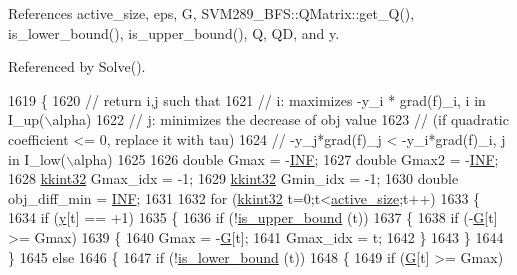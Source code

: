 References active\+\_\+size, eps, G, S\+V\+M289\+\_\+\+B\+F\+S\+::\+Q\+Matrix\+::get\+\_\+\+Q(), is\+\_\+lower\+\_\+bound(), is\+\_\+upper\+\_\+bound(), Q, QD, and y.



Referenced by Solve().


\begin{DoxyCode}
1619 \{
1620   \textcolor{comment}{// return i,j such that}
1621   \textcolor{comment}{// i: maximizes -y\_i * grad(f)\_i, i in I\_up(\(\backslash\)alpha)}
1622   \textcolor{comment}{// j: minimizes the decrease of obj value}
1623   \textcolor{comment}{//    (if quadratic coefficient <= 0, replace it with tau)}
1624   \textcolor{comment}{//    -y\_j*grad(f)\_j < -y\_i*grad(f)\_i, j in I\_low(\(\backslash\)alpha)}
1625   
1626   \textcolor{keywordtype}{double}  Gmax         = -\hyperlink{svm289___b_f_s_8cpp_a12c2040f25d8e3a7b9e1c2024c618cb6}{INF};
1627   \textcolor{keywordtype}{double}  Gmax2        = -\hyperlink{svm289___b_f_s_8cpp_a12c2040f25d8e3a7b9e1c2024c618cb6}{INF};
1628   \hyperlink{namespace_k_k_b_a8fa4952cc84fda1de4bec1fbdd8d5b1b}{kkint32} Gmax\_idx     = -1;
1629   \hyperlink{namespace_k_k_b_a8fa4952cc84fda1de4bec1fbdd8d5b1b}{kkint32} Gmin\_idx     = -1;
1630   \textcolor{keywordtype}{double}  obj\_diff\_min = \hyperlink{svm289___b_f_s_8cpp_a12c2040f25d8e3a7b9e1c2024c618cb6}{INF};
1631 
1632   \textcolor{keywordflow}{for}  (\hyperlink{namespace_k_k_b_a8fa4952cc84fda1de4bec1fbdd8d5b1b}{kkint32} t=0;t<\hyperlink{class_s_v_m289___b_f_s_1_1_solver_a602b406f795ec9054a09d9a1ef23a8c6}{active\_size};t++)
1633   \{
1634     \textcolor{keywordflow}{if}  (\hyperlink{class_s_v_m289___b_f_s_1_1_solver_ab6e1027acd321351163e02445ac37a48}{y}[t] == +1)
1635     \{
1636       \textcolor{keywordflow}{if}  (!\hyperlink{class_s_v_m289___b_f_s_1_1_solver_a1bdbc9dfa56364a34b927beac631d125}{is\_upper\_bound} (t))
1637       \{
1638         \textcolor{keywordflow}{if}  (-\hyperlink{class_s_v_m289___b_f_s_1_1_solver_a23dd808efd06b7ef3a97c54b0c3c8824}{G}[t] >= Gmax)
1639         \{
1640           Gmax     = -\hyperlink{class_s_v_m289___b_f_s_1_1_solver_a23dd808efd06b7ef3a97c54b0c3c8824}{G}[t];
1641           Gmax\_idx = t;
1642         \}
1643       \}
1644     \}
1645     \textcolor{keywordflow}{else}
1646     \{
1647       \textcolor{keywordflow}{if}  (!\hyperlink{class_s_v_m289___b_f_s_1_1_solver_abb89db252806f790b5e9e19f609518ca}{is\_lower\_bound} (t))
1648       \{
1649         \textcolor{keywordflow}{if}  (\hyperlink{class_s_v_m289___b_f_s_1_1_solver_a23dd808efd06b7ef3a97c54b0c3c8824}{G}[t] >= Gmax)

\end{DoxyCode}
